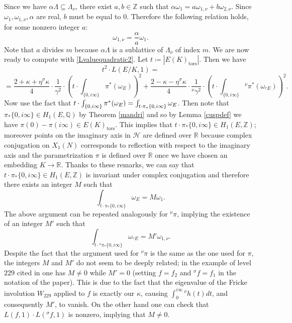 \documentclass[11pt]{amsart}
\theoremstyle{definition}
\begin{document}
		Since we have $\alpha\Lambda{\subseteq} \Lambda_{\nu}$, there exist $a,b\in {\mathbb{Z}}$ such that $\alpha\omega_1=a\omega_{1,\nu}+b\omega_{2,\nu}$. Since $\omega_1,\omega_{1,\nu},\alpha$ are real, $b$ must be equal to $0$. Therefore the following relation holds, for some nonzero integer $a$:
			\begin{equation}\label{realperiods}
				\omega_{1,\nu}=\frac{\alpha}{a}\omega_1.
		\end{equation}
		Note that $a$ divides $m$ because $\alpha\Lambda$ is a sublattice of $\Lambda_{\nu}$ of index $m$.
		We are now ready to compute with \eqref{Lvaluequadratic2}. Let $t\coloneqq |E(K)_{\text{tors}}|$. Then we have
			\begin{equation}\label{intermLvalue}
				t^2\cdot L(E/K,1)=\end{equation}
				$$=\frac{2+\kappa +\eta{{}^\sigma\!}\kappa}{4}\cdot\frac{1}{\gamma^2}\cdot\left(t\cdot\int_{\{0,i\infty\}}\pi^*(\omega_E)\right)^2+\frac{2-\kappa -\eta{{}^\sigma\!}\kappa}{4}\cdot\frac{1}{{{}^\nu\!}\gamma^2}\cdot\left(t\cdot\int_{\{0,i\infty\}}{{}^\nu\!}\pi^*(\omega_{{{}^\nu\!} E})\right)^2.$$
		Now use the fact that ${\displaystyle} t\cdot\int_{\{0,i\infty\}}\pi^*(\omega_E)=\int_{t\cdot \pi_*\{0,i\infty\}}\omega_E$. Then note that $\pi_*\{0,i\infty\}\in H_1(E,{\mathbb{Q}})$ by Theorem \ref{mandri} and so by Lemma \ref{cuspdef} we have $\pi(0)-\pi(i\infty)\in E(K)_{\text{tors}}$. This implies that $t\cdot\pi_*\{0,i\infty\}\in H_1(E,{\mathbb{Z}})$; moreover points on the imaginary axis in ${\mathcal{H}}$ are defined over ${\mathbb{R}}$ because complex conjugation on $X_1(N)$ corresponds to reflection with respect to the imaginary axis and the parametrization $\pi$ is defined over ${\mathbb{R}}$ once we have chosen an embedding $K\to {\mathbb{R}}$. Thanks to these remarks, we can say that $t\cdot\pi_*\{0,i\infty\}\in H_1(E,{\mathbb{Z}})$ is invariant under complex conjugation and therefore there exists an integer $M$ such that
		$$\int_{t\cdot \pi_*\{0,i\infty\}}\omega_E=M\omega_1.$$
		The above argument can be repeated analogously for ${{}^\nu\!}\pi$, implying the existence of an integer $M'$ such that
		$$\int_{t\cdot {{}^\nu\!}\pi_*\{0,i\infty\}}\omega_{{{}^\nu\!} E}=M'\omega_{1,\nu}.$$
		Despite the fact that the argument used for ${{}^\nu\!}\pi$ is the same as the one used for $\pi$, the integers $M$ and $M'$ do not seem to be deeply related; in the example of level $229$ cited in \cite[p.499]{gola} one has $M\neq 0$ while $M'=0$ (setting $f=f_2$ and ${{}^\sigma\!} f=f_1$ in the notation of the paper). This is due to the fact that the eigenvalue of the Fricke involution $W_{229}$ applied to $f$ is exactly our $\kappa$, causing $\int_0^{i\infty}{{}^\nu\!} h(t)dt$, and consequently $M'$, to vanish. On the other hand one can check that $L(f,1)\cdot L({{}^\sigma\!} f,1)$ is nonzero, implying that $M\neq 0$.
\end{document}
